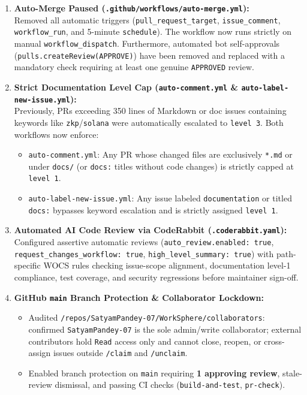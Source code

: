 \documentclass[11pt,a4paper]{article}
\begin{document}
\begin{enumerate}[leftmargin=1.5em, itemsep=5pt]
  \item \textbf{Auto-Merge Paused (\texttt{.github/workflows/auto-merge.yml}):}\\
  Removed all automatic triggers (\texttt{pull\_request\_target}, \texttt{issue\_comment}, \texttt{workflow\_run}, and 5-minute \texttt{schedule}). The workflow now runs strictly on manual \texttt{workflow\_dispatch}. Furthermore, automated bot self-approvals (\texttt{pulls.createReview(APPROVE)}) have been removed and replaced with a mandatory check requiring at least one genuine \texttt{APPROVED} review.

  \item \textbf{Strict Documentation Level Cap (\texttt{auto-comment.yml} \& \texttt{auto-label-new-issue.yml}):}\\
  Previously, PRs exceeding 350 lines of Markdown or doc issues containing keywords like \texttt{zkp}/\texttt{solana} were automatically escalated to \texttt{level 3}. Both workflows now enforce:
  \begin{itemize}[leftmargin=1.5em, itemsep=2pt]
    \item \texttt{auto-comment.yml}: Any PR whose changed files are exclusively \texttt{*.md} or under \texttt{docs/} (or \texttt{docs:} titles without code changes) is strictly capped at \texttt{level 1}.
    \item \texttt{auto-label-new-issue.yml}: Any issue labeled \texttt{documentation} or titled \texttt{docs:} bypasses keyword escalation and is strictly assigned \texttt{level 1}.
  \end{itemize}

  \item \textbf{Automated AI Code Review via CodeRabbit (\texttt{.coderabbit.yaml}):}\\
  Configured assertive automatic reviews (\texttt{auto\_review.enabled: true}, \texttt{request\_changes\_workflow: true}, \texttt{high\_level\_summary: true}) with path-specific WOCS rules checking issue-scope alignment, documentation level-1 compliance, test coverage, and security regressions before maintainer sign-off.

  \item \textbf{GitHub \texttt{main} Branch Protection \& Collaborator Lockdown:}\\
  \begin{itemize}[leftmargin=1.5em, itemsep=2pt]
    \item Audited \texttt{/repos/SatyamPandey-07/WorkSphere/collaborators}: confirmed \texttt{SatyamPandey-07} is the sole admin/write collaborator; external contributors hold \texttt{Read} access only and cannot close, reopen, or cross-assign issues outside \texttt{/claim} and \texttt{/unclaim}.
    \item Enabled branch protection on \texttt{main} requiring \textbf{1 approving review}, stale-review dismissal, and passing CI checks (\texttt{build-and-test}, \texttt{pr-check}).
  \end{itemize}
\end{enumerate}
\end{document}
